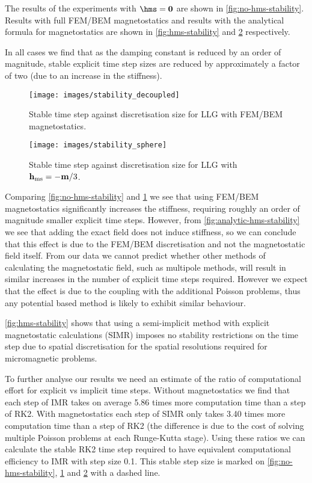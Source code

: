 The results of the experiments with $\hms = \zerov$ are shown in \autoref{fig:no-hms-stability}.
Results with full FEM/BEM magnetostatics and results with the analytical formula for magnetostatics are shown in \autoref{fig:hms-stability} and \ref{fig:analytic-hms-stability} respectively. 

In all cases we find that as the damping constant is reduced by an order of magnitude, stable explicit time step sizes are reduced by approximately a factor of two (due to an increase in the stiffness).

\begin{figure}
  \centering
  \texttt{[image: images/stability\_decoupled]}
  \caption{Stable time step against discretisation size for LLG with FEM/BEM magnetostatics.}
  \label{fig:hms-stability}
\end{figure}


\begin{figure}
  \centering
  \texttt{[image: images/stability\_sphere]}
  \caption{Stable time step against discretisation size for LLG with $\mathbf{h}_{\text{ms}} = - \mathbf{m} / 3$.
  }
  \label{fig:analytic-hms-stability}
\end{figure}

Comparing \autoref{fig:no-hms-stability} and \ref{fig:hms-stability} we see that using FEM/BEM magnetostatics significantly increases the stiffness, requiring roughly an order of magnitude smaller explicit time steps.
However, from \autoref{fig:analytic-hms-stability} we see that adding the exact field does not induce stiffness, so we can conclude that this effect is due to the FEM/BEM discretisation and not the magnetostatic field itself.
From our data we cannot predict whether other methods of calculating the magnetostatic field, such as multipole methods, will result in similar increases in the number of explicit time steps required.
However we expect that the effect is due to the coupling with the additional Poisson problems, thus any potential based method is likely to exhibit similar behaviour.

\autoref{fig:hms-stability} shows that using a semi-implicit method with explicit magnetostatic calculations (SIMR) imposes no stability restrictions on the time step due to spatial discretisation for the spatial resolutions required for micromagnetic problems.

To further analyse our results we need an estimate of the ratio of computational effort for explicit vs implicit time steps. Without magnetostatics we find that each step of IMR takes on average 5.86 times more computation time than a step of RK2. With magnetostatics each step of SIMR only takes 3.40 times more computation time than a step of RK2 (the difference is due to the cost of solving multiple Poisson problems at each Runge-Kutta stage). Using these ratios we can calculate the stable RK2 time step required to have equivalent computational efficiency to IMR with step size 0.1. This stable step size is marked on \autoref{fig:no-hms-stability}, \ref{fig:hms-stability} and \ref{fig:analytic-hms-stability} with a dashed line.

